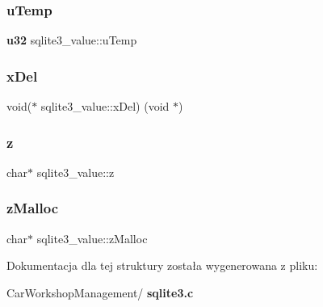 \mbox{\label{structsqlite3__value_adfa9a766a43e673a8a90fe50f2b36fc4}} 
\subsubsection{uTemp}
{\footnotesize\ttfamily \textbf{ u32} sqlite3\+\_\+value\+::u\+Temp}

\mbox{\label{structsqlite3__value_a40cb806c8c47b7f1e22873ce48f61223}} 
\subsubsection{xDel}
{\footnotesize\ttfamily void($\ast$ sqlite3\+\_\+value\+::x\+Del) (void $\ast$)}

\mbox{\label{structsqlite3__value_aef9726f32e031e9d729113fb96ec9948}} 
\subsubsection{z}
{\footnotesize\ttfamily char$\ast$ sqlite3\+\_\+value\+::z}

\mbox{\label{structsqlite3__value_ad1d1f43b9e3a01c62c79d032a73e0b93}} 
\subsubsection{zMalloc}
{\footnotesize\ttfamily char$\ast$ sqlite3\+\_\+value\+::z\+Malloc}



Dokumentacja dla tej struktury została wygenerowana z pliku\+:\begin{DoxyCompactItemize}
\item 
Car\+Workshop\+Management/\textbf{ sqlite3.\+c}\end{DoxyCompactItemize}
